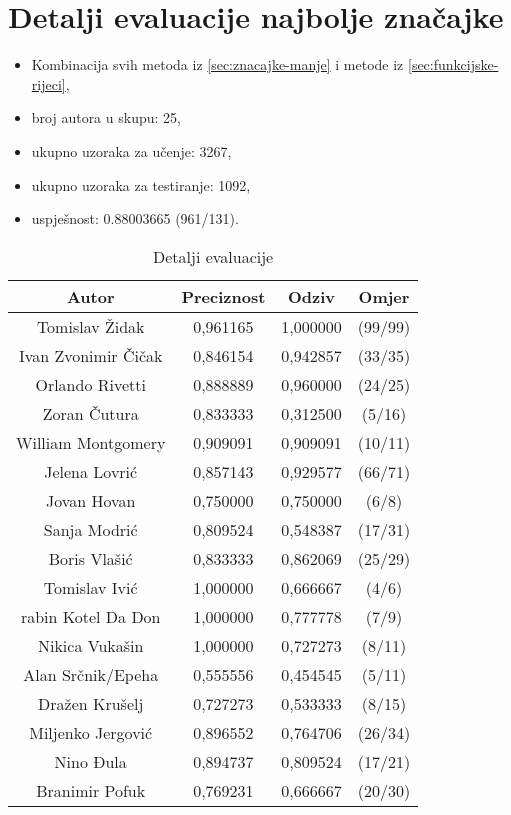 \documentclass{article}
\begin{document}
\section{Detalji evaluacije najbolje značajke}
\label{sec:detalji-evaluacije}
\begin{itemize}
  \item Kombinacija svih metoda iz \ref{sec:znacajke-manje} i metode iz
     \ref{sec:funkcijske-rijeci},
  \item broj autora	u skupu: 25,
  \item ukupno uzoraka za učenje: 3267,
  \item ukupno uzoraka za testiranje: 1092,
  \item uspješnost: 0.88003665 (961/131).
\end{itemize}
\begin{table}[ht]
\caption{Detalji evaluacije}
\centering
\begin{tabular}{c c c c}
\hline\hline
Autor & Preciznost & Odziv & Omjer \\
[0.5ex]
\hline
Tomislav Židak & 0,961165 & 1,000000 & (99/99) \\
Ivan Zvonimir Čičak & 0,846154 & 0,942857 & (33/35) \\
Orlando Rivetti & 0,888889 & 0,960000 & (24/25) \\
Zoran Čutura & 0,833333 & 0,312500 & (5/16) \\
William Montgomery & 0,909091 & 0,909091 & (10/11) \\
Jelena Lovrić & 0,857143 & 0,929577 & (66/71) \\
Jovan Hovan & 0,750000 & 0,750000 & (6/8) \\
Sanja Modrić & 0,809524 & 0,548387 & (17/31) \\
Boris Vlašić & 0,833333 & 0,862069 & (25/29) \\
Tomislav Ivić & 1,000000 & 0,666667 & (4/6) \\
rabin Kotel Da Don & 1,000000 & 0,777778 & (7/9) \\
Nikica Vukašin & 1,000000 & 0,727273 & (8/11) \\
Alan Srčnik/Epeha & 0,555556 & 0,454545 & (5/11) \\
Dražen Krušelj & 0,727273 & 0,533333 & (8/15) \\
Miljenko Jergović & 0,896552 & 0,764706 & (26/34) \\
Nino Đula & 0,894737 & 0,809524 & (17/21) \\
Branimir Pofuk & 0,769231 & 0,666667 & (20/30) \\

\end{tabular}
\end{table}
\end{document}

